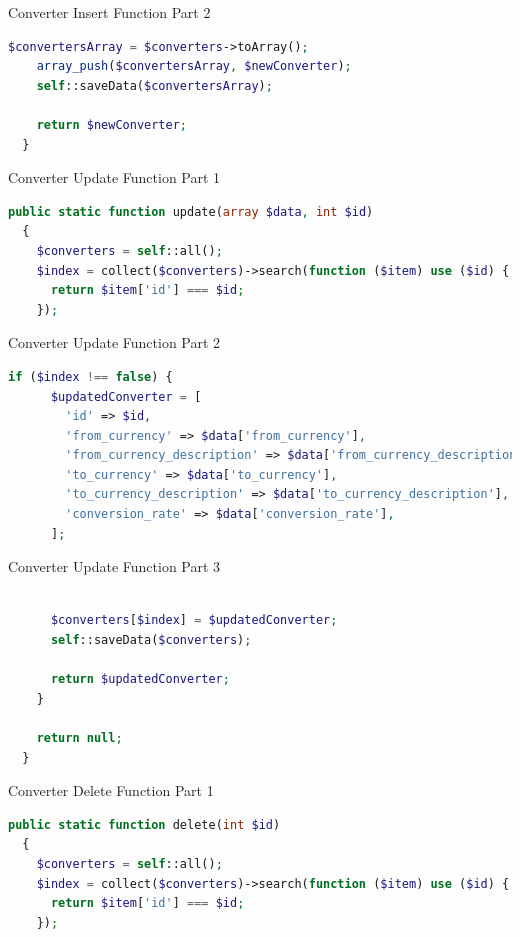 \documentclass[aspectratio=169, table]{beamer}
\begin{document}
\begin{frame}[fragile]{Converter Insert Function Part 2}
\vskip1cm
\begin{lstlisting}[language=PHP]
    $convertersArray = $converters->toArray();
    array_push($convertersArray, $newConverter);
    self::saveData($convertersArray);

    return $newConverter;
  }
\end{lstlisting}
\end{frame}

\begin{frame}[fragile]{Converter Update Function Part 1}
\vskip1cm
\begin{lstlisting}[language=PHP]
public static function update(array $data, int $id)
  {
    $converters = self::all();
    $index = collect($converters)->search(function ($item) use ($id) {
      return $item['id'] === $id;
    });
\end{lstlisting}
\end{frame}

\begin{frame}[fragile]{Converter Update Function Part 2}
\vskip1cm
\begin{lstlisting}[language=PHP]
 if ($index !== false) {
      $updatedConverter = [
        'id' => $id,
        'from_currency' => $data['from_currency'],
        'from_currency_description' => $data['from_currency_description'],
        'to_currency' => $data['to_currency'],
        'to_currency_description' => $data['to_currency_description'],
        'conversion_rate' => $data['conversion_rate'],
      ];
\end{lstlisting}
\end{frame}

\begin{frame}[fragile]{Converter Update Function Part 3}
\vskip1cm
\begin{lstlisting}[language=PHP]

      $converters[$index] = $updatedConverter;
      self::saveData($converters);

      return $updatedConverter;
    }

    return null;
  }
\end{lstlisting}
\end{frame}

\begin{frame}[fragile]{Converter Delete Function Part 1}
\vskip1cm
\begin{lstlisting}[language=PHP]
  public static function delete(int $id)
  {
    $converters = self::all();
    $index = collect($converters)->search(function ($item) use ($id) {
      return $item['id'] === $id;
    });

\end{lstlisting}
\end{frame}
\end{document}
